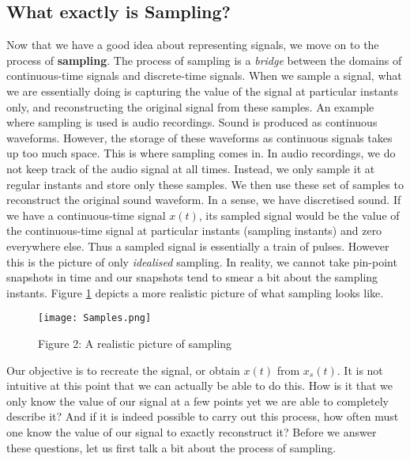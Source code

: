 \documentclass{article}
\theoremstyle{definition}
\begin{document}
	 \subsection{What exactly is Sampling?}
	 Now that we have a good idea about representing signals, we move on to the process of \textbf{sampling}. The process of sampling is a \textit{bridge} between the domains of continuous-time signals and discrete-time signals. When we sample a signal, what we are essentially doing is capturing the value of the signal at particular instants only, and reconstructing the original signal from these samples. An example where sampling is used is audio recordings. Sound is produced as continuous waveforms. However, the storage of these waveforms as continuous signals takes up too much space. This is where sampling comes in. In audio recordings, we do not keep track of the audio signal at all times. Instead, we only sample it at regular instants and store only these samples. We then use these set of samples to reconstruct the original sound waveform. In a sense, we have discretised sound. If we have a continuous-time signal $x(t)$, its sampled signal would be the value of the continuous-time signal at particular instants (sampling instants) and zero everywhere else. Thus a sampled signal is essentially a train of pulses. However this is the picture of only \textit{idealised} sampling. In reality, we cannot take pin-point snapshots in time and our snapshots tend to smear a bit about the sampling instants. Figure \ref{fig: sample1} depicts a more realistic picture of what sampling looks like.

	\begin{figure}[H]
	\centering 
	\texttt{[image: Samples.png]}
	\caption{Figure 2: A realistic picture of sampling}
	\label{fig: sample1}
	\end{figure}
	 Our objective is to recreate the signal, or obtain $x(t)$ from $x_s(t)$. It is not intuitive at this point that we can actually be able to do this. How is it that we only know the value of our signal at a few points yet we are able to completely describe it? And if it is indeed possible to carry out this process, how often must one know the value of our signal to exactly reconstruct it? Before we answer these questions, let us first talk a bit about the process of sampling.
	 
\end{document}
